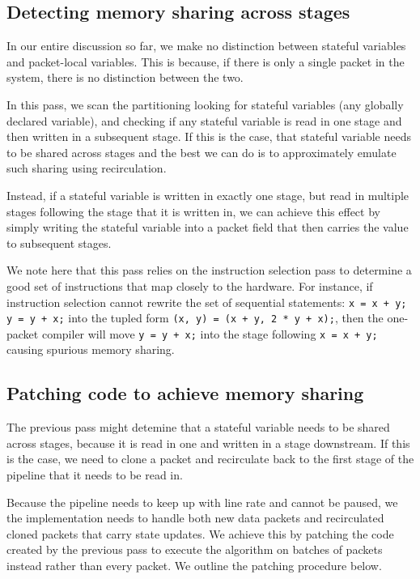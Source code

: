 \subsection{Detecting memory sharing across stages}
In our entire discussion so far, we make no distinction between stateful
variables and packet-local variables. This is because, if there is only a
single packet in the system, there is no distinction between the two.

In this pass, we scan the partitioning looking for stateful variables (any
globally declared variable), and checking if any stateful variable is read in
one stage and then written in a subsequent stage. If this is the case, that
stateful variable needs to be shared across stages and the best we can do is to
approximately emulate such sharing using recirculation.

Instead, if a stateful variable is written in exactly one stage, but read in
multiple stages following the stage that it is written in, we can achieve this
effect by simply writing the stateful variable into a packet field that then
carries the value to subsequent stages.

We note here that this pass relies on the instruction selection pass to
determine a good set of instructions that map closely to the hardware. For
instance, if instruction selection cannot rewrite the set of sequential
statements: \texttt{x = x + y; y = y + x;} into the tupled form \texttt{(x, y)
= (x + y, 2 * y + x);}, then the one-packet compiler will move \texttt{y = y +
x;} into the stage following \texttt{x = x + y;} causing spurious memory
sharing.

\subsection{Patching code to achieve memory sharing}
The previous pass might detemine that a stateful variable needs to be shared
across stages, because it is read in one and written in a stage downstream. If
this is the case, we need to clone a packet and recirculate back to the first
stage of the pipeline that it needs to be read in.

Because the pipeline needs to keep up with line rate and cannot be paused, we
the implementation needs to handle both new data packets and recirculated
cloned packets that carry state updates. We achieve this by patching the code
created by the previous pass to execute the algorithm on batches of packets
instead rather than every packet. We outline the patching procedure below.

